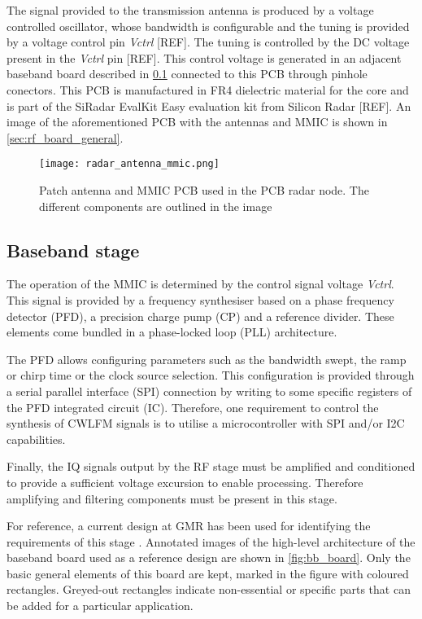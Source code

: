 The signal provided to the transmission antenna is produced by a voltage controlled oscillator, whose bandwidth is configurable and the tuning is provided by a voltage control pin \textit{Vctrl} [REF]. The tuning is controlled by the DC voltage present in the \textit{Vctrl} pin [REF]. This control voltage is generated in an adjacent baseband board described in \cref{sec:baseband_general} connected to this PCB through pinhole conectors. This PCB is manufactured in FR4 dielectric material for the core and is part of the SiRadar EvalKit Easy evaluation kit from Silicon Radar [REF]. An image of the aforementioned PCB with the antennas and MMIC is shown in  \cref{sec:rf_board_general}.

\begin{figure}[ht]
	\centering
	\texttt{[image: radar\_antenna\_mmic.png]}
	\caption{Patch antenna and MMIC PCB used in the PCB radar node. The different components are outlined in the image \label{fig:rf_board_general}}
\end{figure}

\subsection{Baseband stage} \label{sec:baseband_general}

The operation of the MMIC is determined by the control signal voltage \textit{Vctrl}. This signal is provided by a frequency synthesiser based on a phase frequency detector (PFD), a precision charge pump (CP) and a reference divider. These elements come bundled in a phase-locked loop (PLL) architecture.

The PFD allows configuring parameters such as the bandwidth swept, the ramp or chirp time or the clock source selection. This configuration is provided through a serial parallel interface (SPI) connection by writing to some specific registers of the PFD integrated circuit (IC). Therefore, one requirement to control the synthesis of CWLFM signals is to utilise a microcontroller with SPI and/or I2C capabilities.

Finally, the IQ signals output by the RF stage must be amplified and conditioned to provide a sufficient voltage excursion to enable processing. Therefore amplifying and filtering components must be present in this stage.

For reference, a current design at GMR has been used for identifying the requirements of this stage \cite{Sardinero2022}. Annotated images of the high-level architecture of the baseband board used as a reference design are shown in \cref{fig:bb_board}. Only the basic general elements of this board are kept, marked in the figure with coloured rectangles. Greyed-out rectangles indicate non-essential or specific parts that can be added for a particular application.

